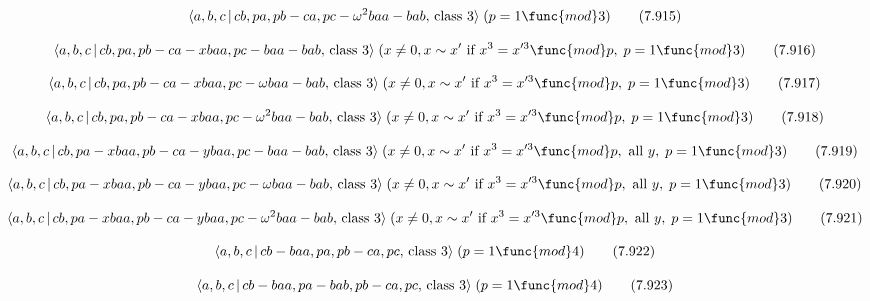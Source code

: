 \documentclass[10pt]{article}
\begin{document}
\begin{equation}
\langle a,b,c\,|\,cb,pa,pb-ca,pc-\omega ^{2}baa-bab,\,\text{class }3\rangle
\;(p=1\func{mod}3)  \tag{7.915}
\end{equation}

\begin{equation}
\langle a,b,c\,|\,cb,pa,pb-ca-xbaa,pc-baa-bab,\,\text{class }3\rangle \;(x
\neq 0, x \sim x^{\prime }\text{ if }x^3=x^{\prime 3 }\func{mod} p,\;p=1 
\func{mod} 3)  \tag{7.916}
\end{equation}

\begin{equation}
\langle a,b,c\,|\,cb,pa,pb-ca-xbaa,pc-\omega baa-bab,\,\text{class }3\rangle
\;(x\neq 0,x \sim x^{\prime }\text{ if }x^3=x^{\prime 3}\func{mod}p,\;p=1%
\func{mod}3)  \tag{7.917}
\end{equation}

\begin{equation}
\langle a,b,c\,|\,cb,pa,pb-ca-xbaa,pc-\omega ^{2}baa-bab,\,\text{class }%
3\rangle \;(x\neq 0,x \sim x^{\prime }\text{ if }x^3=x^{\prime 3}\func{mod}%
p,\;p=1\func{mod}3)  \tag{7.918}
\end{equation}

\begin{equation}
\langle a,b,c\,|\,cb,pa-xbaa,pb-ca-ybaa,pc-baa-bab,\,\text{class }3\rangle
\;(x\neq 0,x \sim x^{\prime }\text{ if }x^3=x^{\prime 3}\func{mod}p,\text{
all }y,\;p=1\func{mod}3)  \tag{7.919}
\end{equation}

\begin{equation}
\langle a,b,c\,|\,cb,pa-xbaa,pb-ca-ybaa,pc-\omega baa-bab,\,\text{class }%
3\rangle \;(x\neq 0,x \sim x^{\prime }\text{ if }x^3=x^{\prime 3}\func{mod}p,%
\text{ all }y,\;p=1\func{mod}3)  \tag{7.920}
\end{equation}

\begin{equation}
\langle a,b,c\,|\,cb,pa-xbaa,pb-ca-ybaa,pc-\omega ^{2}baa-bab,\,\text{class }%
3\rangle \;(x\neq 0,x \sim x^{\prime }\text{ if }x^3=x^{\prime 3}\func{mod}p,%
\text{ all }y,\;p=1\func{mod}3)  \tag{7.921}
\end{equation}

\begin{equation}
\langle a,b,c\,|\,cb-baa,pa,pb-ca,pc,\,\text{class }3\rangle \;(p=1 \func{mod%
} 4)  \tag{7.922}
\end{equation}

\begin{equation}
\langle a,b,c\,|\,cb-baa,pa-bab,pb-ca,pc,\,\text{class }3\rangle \;(p=1 
\func{mod} 4)  \tag{7.923}
\end{equation}
\end{document}
